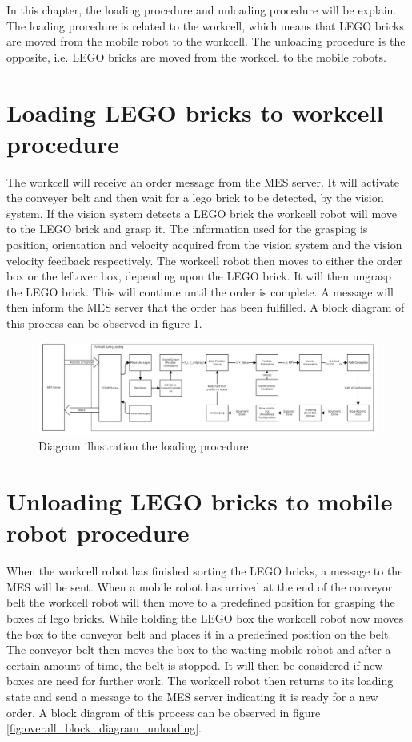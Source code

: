 In this chapter, the loading procedure and unloading procedure will be explain. The loading procedure is related to the workcell, which means that LEGO bricks are moved from the mobile robot to the workcell. The unloading procedure is the opposite, i.e. LEGO bricks are moved from the workcell to the mobile robots.

\section{Loading LEGO bricks to workcell procedure}
The workcell will receive an order message from the MES server. It will activate the conveyer belt and then wait for a lego brick to be detected, by the vision system. If the vision system detects a LEGO brick the workcell robot will move to the LEGO brick and grasp it. The information used for the grasping is position, orientation and velocity acquired from the vision system and the vision velocity feedback respectively. The workcell robot then moves to either the order box or the leftover box, depending upon the LEGO brick. It will then ungrasp the LEGO brick. This will continue until the order is complete. A message will then inform the MES server that the order has been fulfilled. A block diagram of this process can be observed in figure \ref{fig:overall_block_diagram_loading}.

\begin{figure}[ht]
\centering
\includegraphics[width=\textwidth]{images/overall_block_diagram_loading.png}
\caption{Diagram illustration the loading procedure}
\label{fig:overall_block_diagram_loading}
\end{figure}


\section{Unloading LEGO bricks to mobile robot procedure}
When the workcell robot has finished sorting the LEGO bricks, a message to the MES will be sent. When a mobile robot has arrived at the end of the conveyor belt the workcell robot will then move to a predefined position for grasping the boxes of lego bricks. While holding the LEGO box the workcell robot now moves the box to the conveyor belt and places it in a predefined position on the belt. The conveyor belt then moves the box to the waiting mobile robot and after a certain amount of time, the belt is stopped. It will then be considered if new boxes are need for further work. The workcell robot then returns to its loading state and send a message to the MES server indicating it is ready for a new order. A block diagram of this process can be observed in figure \ref{fig:overall_block_diagram_unloading}.

